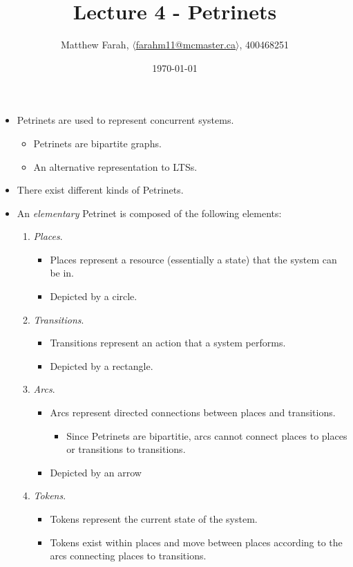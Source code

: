 \documentclass{article}
\title{Lecture 4 - Petrinets}
\author{Matthew Farah, \href{mailto:farahm11@mcmaster.ca}{$\langle$farahm11@mcmaster.ca$\rangle$}, 400468251}
\date{\today}
\begin{document}
\maketitle
\pagestyle{fancy}

\fi

\begin{itemize}
	\item Petrinets are used to represent concurrent systems.
	\begin{itemize}
		\item Petrinets are bipartite graphs.
		\item An alternative representation to LTSs.
	\end{itemize}
	\item There exist different kinds of Petrinets.
	\item An \emph{elementary} Petrinet is composed of the following elements:
	\begin{enumerate}
		\item \emph{Places}.
		\begin{itemize}
			\item Places represent a resource (essentially a state) that the system can be in.
			\item Depicted by a circle.
		\end{itemize}
		\item \emph{Transitions}.
		\begin{itemize}
			\item Transitions represent an action that a system performs.
			\item Depicted by a rectangle.
		\end{itemize}
		\item \emph{Arcs}.
		\begin{itemize}
			\item Arcs represent directed connections between places and transitions.
			\begin{itemize}
				\item Since Petrinets are bipartitie, arcs cannot connect places to places or transitions to transitions.
			\end{itemize}
			\item Depicted by an arrow
		\end{itemize}
		\item \emph{Tokens}.
		\begin{itemize}
			\item Tokens represent the current state of the system.
			\item Tokens exist within places and move between places according to the arcs connecting places to transitions.

\end{itemize}
\end{enumerate}
\end{itemize}
\end{document}
